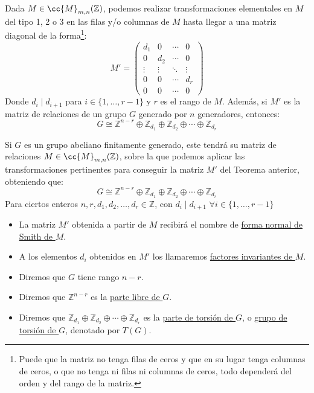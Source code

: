 \begin{teo}
    Dada $M\in \cc{M}_{m,n}(\mathbb{Z})$, podemos realizar transformaciones elementales en $M$ del tipo 1, 2 o 3 en las filas y/o columnas de $M$ hasta llegar a una matriz diagonal de la forma\footnote{Puede que la matriz no tenga filas de ceros y que en su lugar tenga columnas de ceros, o que no tenga ni filas ni columnas de ceros, todo dependerá del orden y del rango de la matriz.}:
    \begin{equation*}
        M' = \left(\begin{array}{cccc}
            d_1 & 0 & \cdots & 0 \\
            0 & d_2 & \cdots & 0 \\
            \vdots & \vdots & \ddots & \vdots \\
            0 & 0 & \cdots &  d_r \\
            0 & 0 & \cdots & 0 
        \end{array}\right)
    \end{equation*}
    Donde $d_i \mid d_{i+1}$ para $i \in \{1,\ldots,r-1\}$ y $r$ es el rango de $M$. Además, si $M'$ es la matriz de relaciones de un grupo $G$ generado por $n$ generadores, entonces:
    \begin{equation*}
        G \cong \mathbb{Z}^{n-r} \oplus \mathbb{Z}_{d_1} \oplus \mathbb{Z}_{d_2} \oplus \cdots \oplus \mathbb{Z}_{d_r}
    \end{equation*}
\end{teo}

\begin{definicion}
    Si $G$ es un grupo abeliano finitamente generado, este tendrá su matriz de relaciones $M\in \cc{M}_{m,n}(\mathbb{Z})$, sobre la que podemos aplicar las transformaciones pertinentes para conseguir la matriz $M'$ del Teorema anterior, obteniendo que:
    \begin{equation*}
        G \cong \mathbb{Z}^{n-r} \oplus \mathbb{Z}_{d_1} \oplus \mathbb{Z}_{d_2} \oplus \cdots \oplus \mathbb{Z}_{d_r}
    \end{equation*}
    Para ciertos enteros $n,r,d_1,d_2,\ldots,d_r\in \mathbb{Z}$, con $d_i \mid d_{i+1}$ $\forall i \in \{1,\ldots,r-1\}$
    \begin{itemize}
    \item La matriz $M'$ obtenida a partir de $M$ recibirá el nombre de \underline{forma normal de} \underline{Smith de $M$}.
        \item A los elementos $d_i$ obtenidos en $M'$ los llamaremos \underline{factores invariantes de $M$}.
        \item Diremos que $G$ tiene rango $n-r$.
        \item Diremos que $\mathbb{Z}^{n-r}$ es la \underline{parte libre de $G$}.
        \item Diremos que $\mathbb{Z}_{d_1}\oplus \mathbb{Z}_{d_2}\oplus \cdots \oplus \mathbb{Z}_{d_r}$ es la \underline{parte de torsión de $G$}, o \underline{grupo de} \underline{torsión de $G$}, denotado por $T(G)$.
    \end{itemize}
\end{definicion}

